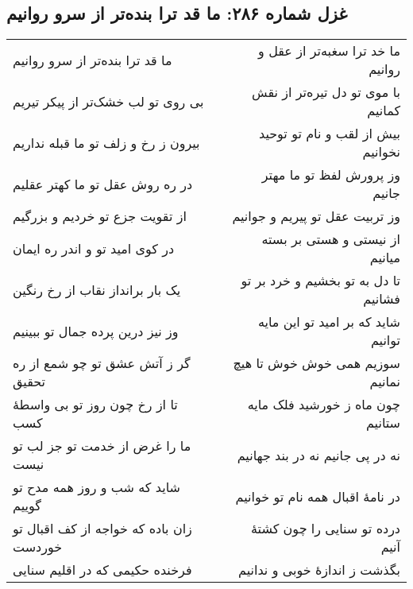 \begin{center}
\section*{غزل شماره ۲۸۶: ما قد ترا بنده‌تر از سرو روانیم}
\label{sec:286}
\begin{longtable}{l p{0.5cm} r}
ما قد ترا بنده‌تر از سرو روانیم
&&
ما خد ترا سغبه‌تر از عقل و روانیم
\\
بی روی تو لب خشک‌تر از پیکر تیریم
&&
با موی تو دل تیره‌تر از نقش کمانیم
\\
بیرون ز رخ و زلف تو ما قبله نداریم
&&
بیش از لقب و نام تو توحید نخوانیم
\\
در ره روش عقل تو ما کهتر عقلیم
&&
وز پرورش لفظ تو ما مهتر جانیم
\\
از تقویت جزع تو خردیم و بزرگیم
&&
وز تربیت عقل تو پیریم و جوانیم
\\
در کوی امید تو و اندر ره ایمان
&&
از نیستی و هستی بر بسته میانیم
\\
یک بار برانداز نقاب از رخ رنگین
&&
تا دل به تو بخشیم و خرد بر تو فشانیم
\\
وز نیز درین پرده جمال تو ببینیم
&&
شاید که بر امید تو این مایه توانیم
\\
گر ز آتش عشق تو چو شمع از ره تحقیق
&&
سوزیم همی خوش خوش تا هیچ نمانیم
\\
تا از رخ چون روز تو بی واسطهٔ کسب
&&
چون ماه ز خورشید فلک مایه ستانیم
\\
ما را غرض از خدمت تو جز لب تو نیست
&&
نه در پی جانیم نه در بند جهانیم
\\
شاید که شب و روز همه مدح تو گوییم
&&
در نامهٔ اقبال همه نام تو خوانیم
\\
زان باده که خواجه از کف اقبال تو خوردست
&&
درده تو سنایی را چون کشتهٔ آنیم
\\
فرخنده حکیمی که در اقلیم سنایی
&&
بگذشت ز اندازهٔ خوبی و ندانیم
\\
\end{longtable}
\end{center}
